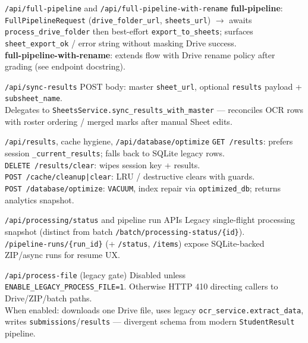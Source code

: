 \documentclass[aspectratio=169]{beamer}
\begin{document}
\begin{frame}{\texttt{/api/full-pipeline} and \texttt{/api/full-pipeline-with-rename}}
  \small
  \textbf{full-pipeline}: \texttt{FullPipelineRequest} (\texttt{drive\_folder\_url}, \texttt{sheets\_url}) $\rightarrow$ awaits \texttt{process\_drive\_folder} then best-effort \texttt{export\_to\_sheets}; surfaces \texttt{sheet\_export\_ok} / error string without masking Drive success.\\
  \textbf{full-pipeline-with-rename}: extends flow with Drive rename policy after grading (see endpoint docstring).
\end{frame}

\begin{frame}{\texttt{/api/sync-results}}
  \small
  POST body: master \texttt{sheet\_url}, optional \texttt{results} payload + \texttt{subsheet\_name}.\\
  Delegates to \texttt{SheetsService.sync\_results\_with\_master} --- reconciles OCR rows with roster ordering / merged marks after manual Sheet edits.
\end{frame}

\begin{frame}{\texttt{/api/results}, cache hygiene, \texttt{/api/database/optimize}}
  \tiny
  \texttt{GET /results}: prefers session \texttt{\_current\_results}; falls back to SQLite legacy rows.\\
  \texttt{DELETE /results/clear}: wipes session key + results.\\
  \texttt{POST /cache/cleanup|clear}: LRU / destructive clears with guards.\\
  \texttt{POST /database/optimize}: \texttt{VACUUM}, index repair via \texttt{optimized\_db}; returns analytics snapshot.
\end{frame}

\begin{frame}{\texttt{/api/processing/status} and pipeline run APIs}
  \small
  Legacy single-flight processing snapshot (distinct from batch \texttt{/batch/processing-status/\{id\}}).\\
  \texttt{/pipeline-runs/\{run\_id\}} (+ \texttt{/status}, \texttt{/items}) expose SQLite-backed ZIP/async runs for resume UX.
\end{frame}

\begin{frame}{\texttt{/api/process-file} (legacy gate)}
  \small
  Disabled unless \texttt{ENABLE\_LEGACY\_PROCESS\_FILE=1}. Otherwise HTTP 410 directing callers to Drive/ZIP/batch paths.\\
  When enabled: downloads one Drive file, uses legacy \texttt{ocr\_service.extract\_data}, writes \texttt{submissions}/\texttt{results} --- divergent schema from modern \texttt{StudentResult} pipeline.
\end{frame}
\end{document}
